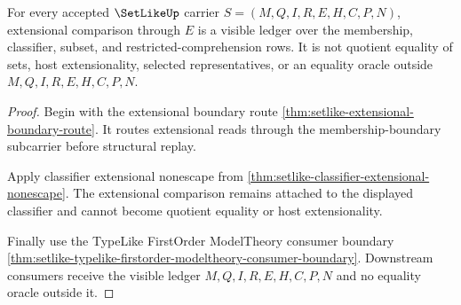 \begin{theorem}
\label{thm:setlike-extensional-ledger-kernel-nonescape}
For every accepted $\SetLikeUp$ carrier $S=(M,Q,I,R,E,H,C,P,N)$, extensional comparison through $E$ is a visible ledger over the membership, classifier, subset, and restricted-comprehension rows. It is not quotient equality of sets, host extensionality, selected representatives, or an equality oracle outside $M,Q,I,R,E,H,C,P,N$.
\end{theorem}
\begin{proof}
Begin with the extensional boundary route \autoref{thm:setlike-extensional-boundary-route}. It routes extensional reads through the membership-boundary subcarrier before structural replay.

Apply classifier extensional nonescape from \autoref{thm:setlike-classifier-extensional-nonescape}. The extensional comparison remains attached to the displayed classifier and cannot become quotient equality or host extensionality.

Finally use the TypeLike FirstOrder ModelTheory consumer boundary \autoref{thm:setlike-typelike-firstorder-modeltheory-consumer-boundary}. Downstream consumers receive the visible ledger $M,Q,I,R,E,H,C,P,N$ and no equality oracle outside it.
\end{proof}

